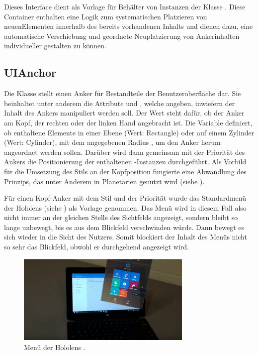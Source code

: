 			Dieses Interface dient als Vorlage für Behälter von Instanzen der Klasse . \linebreak Diese Container enthalten eine Logik zum systematischen Platzieren von neuen\linebreak Elementen innerhalb des bereits vorhandenen Inhalts und dienen dazu, eine automatische Verschiebung und geordnete Neuplatzierung von Ankerinhalten individueller gestalten zu können.
			
		\subsection{UIAnchor}
			Die Klasse  stellt einen Anker für Bestandteile der Benutzeroberfläche dar. Sie beinhaltet unter anderem die Attribute  und , welche angeben, inwiefern der Inhalt des Ankers manipuliert werden soll. Der Wert  steht dafür, ob der Anker am Kopf, der rechten oder der linken Hand angebracht ist. Die Variable  definiert, ob enthaltene Elemente in einer Ebene (Wert: Rectangle) oder auf einem Zylinder (Wert: Cylinder), mit dem angegebenen Radius , um den Anker herum angeordnet werden sollen. Darüber wird dann gemeinsam mit der Priorität des Ankers die Positionierung der enthaltenen -Instanzen durchgeführt.
			Als Vorbild für die Umsetzung des Stils  an der Kopfposition fungierte eine Abwandlung des Prinzips, das unter Anderem in Planetarien genutzt wird (siehe ).
			
			Für einen Kopf-Anker mit dem Stil  und der Priorität  wurde das Standardmenü der Hololens (siehe ) als Vorlage genommen. Das Menü wird in diesem Fall also nicht immer an der gleichen Stelle des Sichtfelds angezeigt, sondern bleibt so lange unbewegt, bis es aus dem Blickfeld verschwinden würde. Dann bewegt es sich wieder in die Sicht des Nutzers. Somit blockiert der Inhalt des Menüs nicht so sehr das Blickfeld, obwohl er durchgehend angezeigt wird.
			\begin{figure}[htbp]
				\centering
				\includegraphics[width=0.75\textwidth]{figures/HololensMain.png}
				\caption{Menü der Hololens .}
				\label{fig:hololensMain}
			\end{figure}
			
